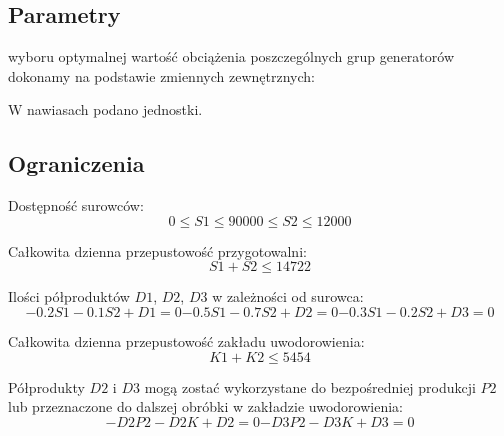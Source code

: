 \documentclass[a4paper,10pt,fleqn]{article}
\begin{document}
		\subsection{Parametry}
		wyboru optymalnej wartość obciążenia poszczególnych grup generatorów dokonamy na podstawie zmiennych zewnętrznych:

		W nawiasach podano jednostki.

		\subsection{Ograniczenia}

		Dostępność surowców:
		\begin{subequations}
			\begin{equation}
				0 \leq S1 \leq 9000
			\end{equation}
			\begin{equation}
				0 \leq S2 \leq 12000
			\end{equation}
		\end{subequations}

		Całkowita dzienna przepustowość przygotowalni:
		\begin{equation}
			S1 + S2 \leq 14722
		\end{equation}

		Ilości półproduktów $D1$, $D2$, $D3$ w zależności od surowca:
		\begin{subequations}
			\begin{equation}
				-0.2S1 - 0.1S2 + D1 = 0
			\end{equation}			
			\begin{equation}
				-0.5S1 - 0.7S2 + D2 = 0
			\end{equation}
			\begin{equation}
				-0.3S1 - 0.2S2 + D3 = 0
			\end{equation}
		\end{subequations}

		Całkowita dzienna przepustowość zakładu uwodorowienia:
		\begin{equation}
			K1 + K2 \leq 5454
		\end{equation}

		Półprodukty $D2$ i $D3$ mogą zostać wykorzystane do bezpośredniej produkcji $P2$ lub przeznaczone do dalszej obróbki w zakładzie uwodorowienia:
		\begin{subequations}
			\begin{equation}
				-D2P2 - D2K + D2 = 0
			\end{equation}
			\begin{equation}
				-D3P2 - D3K + D3 = 0
			\end{equation}
		\end{subequations}
\end{document}
